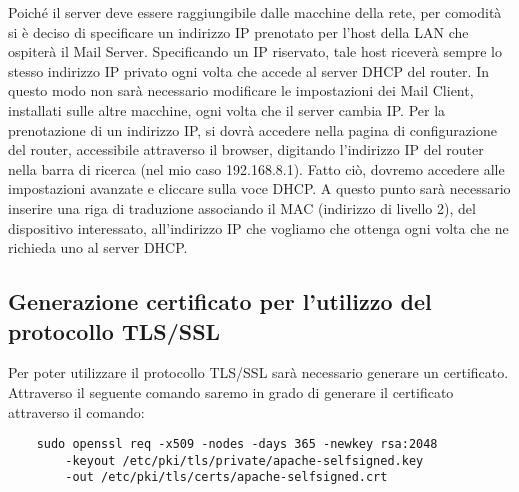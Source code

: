 Poiché il server deve essere raggiungibile dalle macchine della rete, 
per comodità si è deciso di specificare un indirizzo IP prenotato per l’host della LAN che ospiterà il Mail Server. 
Specificando un IP riservato, tale host riceverà sempre lo stesso indirizzo IP privato ogni volta che accede al 
server DHCP del router. In questo modo non sarà necessario modificare le impostazioni dei Mail Client, 
installati sulle altre macchine, ogni volta che il server cambia IP.
Per la prenotazione di un indirizzo IP, si dovrà accedere nella pagina di configurazione del router, 
accessibile attraverso il browser, digitando l’indirizzo IP del router nella barra di ricerca 
(nel mio caso 192.168.8.1). Fatto ciò, dovremo accedere alle impostazioni avanzate e cliccare sulla voce DHCP. 
A questo punto sarà necessario inserire una riga di traduzione associando il MAC (indirizzo di livello 2), 
del dispositivo interessato, all’indirizzo IP che vogliamo che ottenga ogni volta che ne richieda uno al server DHCP.

\begin{table}[htp]
    \centering
    \end{table}

\subsection{Generazione certificato per l'utilizzo del protocollo TLS/SSL}
Per poter utilizzare il protocollo TLS/SSL sarà necessario generare un certificato.
Attraverso il seguente comando saremo in grado di generare il certificato attraverso il comando:

\begin{verbatim}
    sudo openssl req -x509 -nodes -days 365 -newkey rsa:2048 
        -keyout /etc/pki/tls/private/apache-selfsigned.key 
        -out /etc/pki/tls/certs/apache-selfsigned.crt
\end{verbatim}

